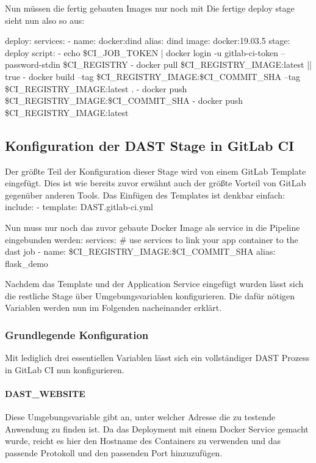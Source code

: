 Nun müssen die fertig gebauten Images nur noch mit %
Die fertige deploy stage sieht nun also so aus:

deploy:
  services:
  - name: docker:dind
    alias: dind
  image: docker:19.03.5
  stage: deploy
  script:
    - echo \$CI_JOB_TOKEN | docker login -u gitlab-ci-token --password-stdin \$CI_REGISTRY
    - docker pull \$CI_REGISTRY_IMAGE:latest || true
    - docker build --tag \$CI_REGISTRY_IMAGE:\$CI_COMMIT_SHA --tag \$CI_REGISTRY_IMAGE:latest .
    - docker push \$CI_REGISTRY_IMAGE:\$CI_COMMIT_SHA
    - docker push \$CI_REGISTRY_IMAGE:latest


\subsection{Konfiguration der DAST Stage in GitLab CI}

Der größte Teil der Konfiguration dieser Stage wird von einem GitLab Template eingefügt.\cite{DynamicApplicationSecurity}
Dies ist wie bereits zuvor erwähnt auch der größte Vorteil von GitLab gegenüber anderen Tools.
Das Einfügen des Templates ist denkbar einfach:
include:
  - template: DAST.gitlab-ci.yml

Nun muss nur noch das zuvor gebaute Docker Image als service in die Pipeline eingebunden werden:
services: # use services to link your app container to the dast job
  - name: \$CI_REGISTRY_IMAGE:\$CI_COMMIT_SHA
    alias: flask_demo

Nachdem das Template und der Application Service eingefügt wurden lässt sich die restliche Stage über Umgebungsvariablen konfigurieren.
Die dafür nötigen Variablen werden nun im Folgenden nacheinander erklärt.

\subsubsection{Grundlegende Konfiguration}

Mit lediglich drei essentiellen Variablen lässt sich ein vollständiger DAST Prozess in GitLab CI nun konfigurieren.

\paragraph{DAST\_WEBSITE} Diese Umgebungsvariable gibt an, unter welcher Adresse die zu testende Anwendung zu finden ist.
Da das Deployment mit einem Docker Service gemacht wurde, reicht es hier den Hostname des Containers zu verwenden und das passende Protokoll und den passenden Port hinzuzufügen.
